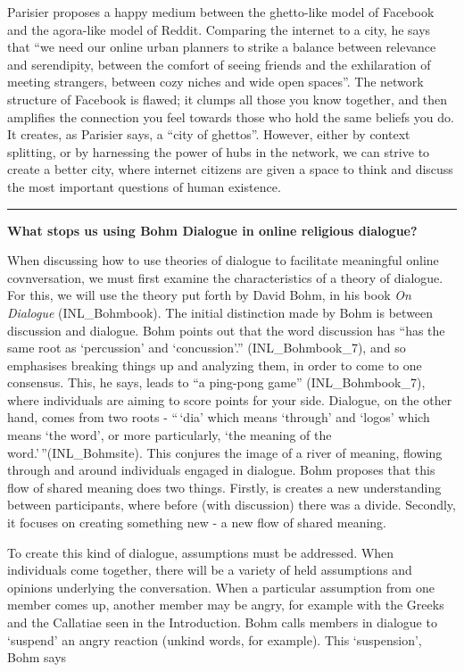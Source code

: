 \documentclass[]{article}
\begin{document}
Parisier proposes a happy medium between the ghetto-like model of
Facebook and the agora-like model of Reddit. Comparing the internet to a
city, he says that ``we need our online urban planners to strike a
balance between relevance and serendipity, between the comfort of seeing
friends and the exhilaration of meeting strangers, between cozy niches
and wide open spaces''\autocite[pg 222]{PariserFilterBubblewhat2012}.
The network structure of Facebook is flawed; it clumps all those you
know together, and then amplifies the connection you feel towards those
who hold the same beliefs you do. It creates, as Parisier says, a ``city
of ghettos''\autocite[pg 222]{PariserFilterBubblewhat2012}. However,
either by context splitting, or by harnessing the power of hubs in the
network, we can strive to create a better city, where internet citizens
are given a space to think and discuss the most important questions of
human existence.

\begin{center}\rule{0.5\linewidth}{\linethickness}\end{center}

\textbf{What stops us using Bohm Dialogue in online religious dialogue?}

When discussing how to use theories of dialogue to facilitate meaningful
online covnversation, we must first examine the characteristics of a
theory of dialogue. For this, we will use the theory put forth by David
Bohm, in his book \emph{On Dialogue} (INL\_Bohmbook). The initial
distinction made by Bohm is between discussion and dialogue. Bohm points
out that the word discussion has ``has the same root as `percussion' and
`concussion'.'' (INL\_Bohmbook\_7), and so emphasises breaking things up
and analyzing them, in order to come to one consensus. This, he says,
leads to ``a ping-pong game'' (INL\_Bohmbook\_7), where individuals are
aiming to score points for your side. Dialogue, on the other hand, comes
from two roots - ``\,`dia' which means `through' and `logos' which means
`the word', or more particularly, `the meaning of the
word.'\,''(INL\_Bohmsite). This conjures the image of a river of
meaning, flowing through and around individuals engaged in dialogue.
Bohm proposes that this flow of shared meaning does two things. Firstly,
is creates a new understanding between participants, where before (with
discussion) there was a divide. Secondly, it focuses on creating
something new - a new flow of shared meaning.

To create this kind of dialogue, assumptions must be addressed. When
individuals come together, there will be a variety of held assumptions
and opinions underlying the conversation. When a particular assumption
from one member comes up, another member may be angry, for example with
the Greeks and the Callatiae seen in the Introduction. Bohm calls
members in dialogue to `suspend' an angry reaction (unkind words, for
example). This `suspension', Bohm says
\end{document}
